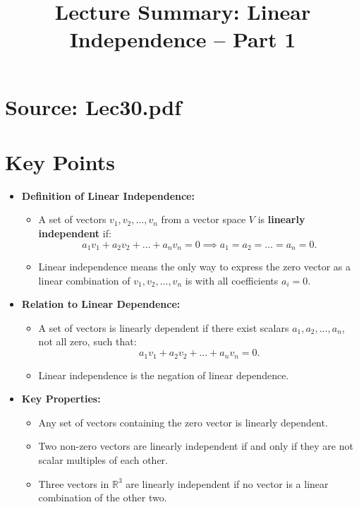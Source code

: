 \documentclass{article}
\title{Lecture Summary: Linear Independence – Part 1}
\author{}
\date{}
\begin{document}
\maketitle

\section*{Source: Lec30.pdf}

\section*{Key Points}

\begin{itemize}
  \item \textbf{Definition of Linear Independence:}
    \begin{itemize}
      \item A set of vectors $v_1, v_2, \dots, v_n$ from a vector space $V$ is \textbf{linearly independent} if:
        \[
          a_1 v_1 + a_2 v_2 + \dots + a_n v_n = 0 \implies a_1 = a_2 = \dots = a_n = 0.
        \]
      \item Linear independence means the only way to express the zero vector as a linear combination of $v_1, v_2, \dots, v_n$ is with all coefficients $a_i = 0$.
    \end{itemize}

  \item \textbf{Relation to Linear Dependence:}
    \begin{itemize}
      \item A set of vectors is linearly dependent if there exist scalars $a_1, a_2, \dots, a_n$, not all zero, such that:
        \[
          a_1 v_1 + a_2 v_2 + \dots + a_n v_n = 0.
        \]
      \item Linear independence is the negation of linear dependence.
    \end{itemize}

  \item \textbf{Key Properties:}
    \begin{itemize}
      \item Any set of vectors containing the zero vector is linearly dependent.
      \item Two non-zero vectors are linearly independent if and only if they are not scalar multiples of each other.
      \item Three vectors in $\mathbb{R}^3$ are linearly independent if no vector is a linear combination of the other two.
    \end{itemize}


\end{itemize}
\end{document}
